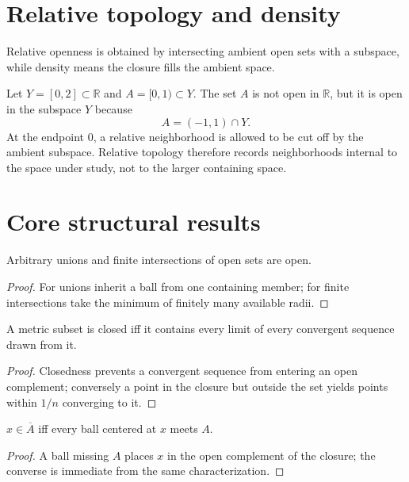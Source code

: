\section{Relative topology and density}
Relative openness is obtained by intersecting ambient open sets with a subspace, while density means the closure fills the ambient space.


\begin{example}\label{ex:ii04-expand-03}
Let \(Y=[0,2]\subset\mathbb R\) and \(A=[0,1)\subset Y\). The set \(A\) is not
open in \(\mathbb R\), but it is open in the subspace \(Y\) because
\[
A=(-1,1)\cap Y.
\]
At the endpoint \(0\), a relative neighborhood is allowed to be cut off by the
ambient subspace. Relative topology therefore records neighborhoods internal
to the space under study, not to the larger containing space.
\end{example}
\section{Core structural results}

\begin{theorem}\label{thm:ii04-01}
Arbitrary unions and finite intersections of open sets are open.
\begin{proof}
For unions inherit a ball from one containing member; for finite intersections take the minimum of finitely many available radii.
\end{proof}
\end{theorem}

\begin{theorem}\label{thm:ii04-02}
A metric subset is closed iff it contains every limit of every convergent sequence drawn from it.
\begin{proof}
Closedness prevents a convergent sequence from entering an open complement; conversely a point in the closure but outside the set yields points within $1/n$ converging to it.
\end{proof}
\end{theorem}

\begin{theorem}\label{thm:ii04-03}
$x\in\overline A$ iff every ball centered at $x$ meets $A$.
\begin{proof}
A ball missing $A$ places $x$ in the open complement of the closure; the converse is immediate from the same characterization.
\end{proof}
\end{theorem}


